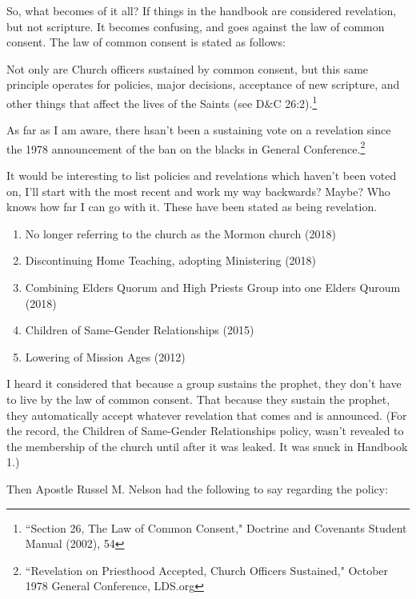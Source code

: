So, what becomes of it all? If things in the handbook are considered revelation, but
not scripture. It becomes confusing, and goes against the law of common consent. The
law of common consent is stated as follows:

\begin{displayquote}
Not only are Church officers sustained by common consent, but this same principle 
operates for policies, major decisions, acceptance of new scripture, and other things 
that affect the lives of the Saints (see D\&C 26:2).\footnote{``Section 26, The Law 
of Common Consent," Doctrine and Covenants Student Manual (2002), 54}
\end{displayquote}

As far as I am aware, there hsan't been a sustaining vote on a revelation since the
1978 announcement of the ban on the blacks in General Conference.\footnote{
``Revelation on Priesthood Accepted, Church Officers Sustained," October 1978 General
Conference, LDS.org
}

It would be interesting to list policies and revelations which haven't been voted on,
I'll start with the most recent and work my way backwards? Maybe? Who knows how far I
can go with it. These have been stated as being revelation.

\begin{enumerate}
\item No longer referring to the church as the Mormon church (2018)
\item Discontinuing Home Teaching, adopting Ministering (2018)
\item Combining Elders Quorum and High Priests Group into one Elders Quroum (2018)
\item Children of Same-Gender Relationships (2015)
\item Lowering of Mission Ages (2012)
\end{enumerate}

I heard it considered that because a group sustains the prophet, they don't have to
live by the law of common consent. That because they sustain the prophet, they
automatically accept whatever revelation that comes and is announced. (For the
  record, the Children of Same-Gender Relationships policy, wasn't revealed to
  the membership of the church until after it was leaked. It was snuck in Handbook
  1.)

Then Apostle Russel M. Nelson had the following to say regarding the policy:

